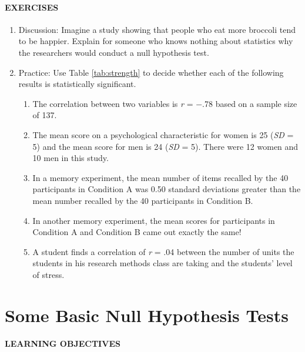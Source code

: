 \documentclass[
]{krantz}
\providecommand{\tightlist}{%
  \setlength{\itemsep}{0pt}\setlength{\parskip}{0pt}}
\begin{document}
\hypertarget{exercises-30}{%
\paragraph*{EXERCISES}\label{exercises-30}}

\begin{enumerate}
\def\labelenumi{\arabic{enumi}.}
\tightlist
\item
  Discussion: Imagine a study showing that people who eat more broccoli tend to be happier. Explain for someone who knows nothing about statistics why the researchers would conduct a null hypothesis test.
\item
  Practice: Use Table \ref{tab:strength} to decide whether each of the following results is statistically significant.

  \begin{enumerate}
  \def\labelenumii{\alph{enumii}.}
  \tightlist
  \item
    The correlation between two variables is \emph{r} = −.78 based on a sample size of 137.
  \item
    The mean score on a psychological characteristic for women is 25 (\emph{SD} = 5) and the mean score for men is 24 (\emph{SD} = 5). There were 12 women and 10 men in this study.
  \item
    In a memory experiment, the mean number of items recalled by the 40 participants in Condition A was 0.50 standard deviations greater than the mean number recalled by the 40 participants in Condition B.
  \item
    In another memory experiment, the mean scores for participants in Condition A and Condition B came out exactly the same!
  \item
    A student finds a correlation of \emph{r} = .04 between the number of units the students in his research methods class are taking and the students' level of stress.
  \end{enumerate}
\end{enumerate}

\hypertarget{some-basic-null-hypothesis-tests}{%
\section{Some Basic Null Hypothesis Tests}\label{some-basic-null-hypothesis-tests}}

\hypertarget{learning-objectives-39}{%
\paragraph*{LEARNING OBJECTIVES}\label{learning-objectives-39}}
\end{document}
